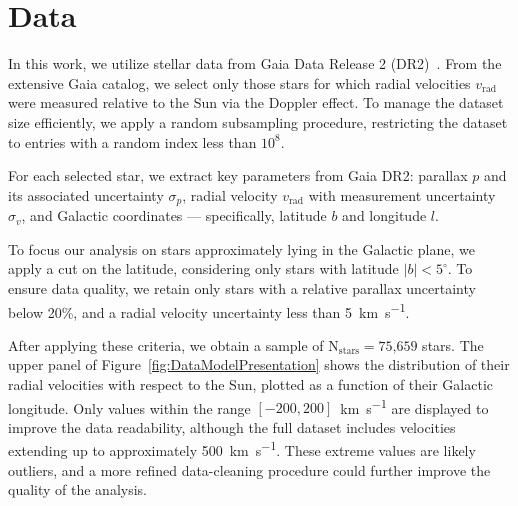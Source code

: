 \section{Data}

In this work, we utilize stellar data from Gaia Data Release 2 (DR2)~\cite{GAIADR2}.  
From the extensive Gaia catalog, we select only those stars 
for which radial velocities $v_{\text{rad}}$ were measured relative to the Sun via the Doppler effect.  
To manage the dataset size efficiently, we apply a random subsampling procedure, 
restricting the dataset to entries with a random index less than $10^8$.

For each selected star, we extract key parameters from Gaia DR2: 
parallax $p$ and its associated uncertainty $\sigma_{p}$, 
radial velocity $v_{\text{rad}}$ with measurement uncertainty $\sigma_{v}$, 
and Galactic coordinates — specifically, latitude $b$ and longitude $l$.

To focus our analysis on stars approximately lying in the Galactic plane, we apply a cut on the latitude, considering only stars with latitude $\vert b \vert < 5^\circ$.  
To ensure data quality, we retain only stars with a relative parallax uncertainty below 20\%, 
and a radial velocity uncertainty less than 5~\unit{\kilo\meter\per\second}.  

After applying these criteria, we obtain a sample of $\text{N}_{\text{stars}}=75\text{,}659$ stars. 
The upper panel of Figure~\ref{fig:DataModelPresentation} shows the distribution of their radial velocities with respect to the Sun, plotted as a function of their Galactic longitude. Only values within the range $[-200, 200]$~\unit{\kilo\meter\per\second} are displayed to improve the data readability, although the full dataset includes velocities extending up to approximately 500~\unit{\kilo\meter\per\second}. 
These extreme values are likely outliers, and a more refined data-cleaning procedure could further improve the quality of the analysis.

